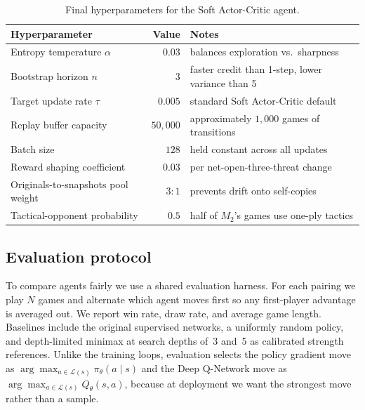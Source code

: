 \documentclass[11pt]{article}
\begin{document}
\begin{table}[h]
  \centering
  \begin{tabular}{lrl}
    \toprule
    Hyperparameter                          & Value      & Notes \\
    \midrule
    Entropy temperature $\alpha$            & $0.03$     & balances exploration vs.\ sharpness \\
    Bootstrap horizon $n$                   & $3$        & faster credit than 1-step, lower variance than 5 \\
    Target update rate $\tau$               & $0.005$    & standard Soft Actor-Critic default \\
    Replay buffer capacity                  & $50{,}000$ & approximately $1{,}000$ games of transitions \\
    Batch size                              & $128$      & held constant across all updates \\
    Reward shaping coefficient              & $0.03$     & per net-open-three-threat change \\
    Originals-to-snapshots pool weight      & $3 : 1$    & prevents drift onto self-copies \\
    Tactical-opponent probability           & $0.5$      & half of $M_2$'s games use one-ply tactics \\
    \bottomrule
  \end{tabular}
  \caption{Final hyperparameters for the Soft Actor-Critic agent.}
  \label{tab:sac_hparams}
\end{table}

\subsection{Evaluation protocol}
\label{ssec:eval}

To compare agents fairly we use a shared evaluation harness. For each
pairing we play $N$ games and alternate which agent moves first so any
first-player advantage is averaged out. We report win rate, draw rate, and
average game length. Baselines include the original supervised networks, a
uniformly random policy, and depth-limited minimax at search depths of~3
and~5 as calibrated strength references. Unlike the training loops,
evaluation selects the policy gradient move as
$\arg\max_{a \in \mathcal{L}(s)} \pi_\theta(a \mid s)$ and the Deep Q-Network
move as $\arg\max_{a \in \mathcal{L}(s)} Q_\theta(s, a)$, because at
deployment we want the strongest move rather than a sample.
\end{document}
